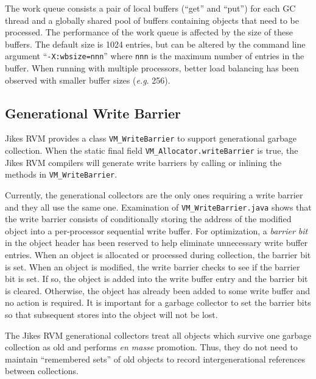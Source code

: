 The work queue consists a pair of local buffers (``get'' and ``put'') for each GC thread
and a globally shared pool of buffers containing objects that need to be processed.  
The performance of the work queue is affected by the size of these buffers.  
The default size is 1024 entries, but can be altered by the command line argument ``{\tt -X:wbsize=nnn}'' 
where {\tt nnn} is the maximum number of entries in the buffer.  When running with multiple
processors, better load balancing has been observed with smaller buffer sizes ({\it e.g}. 256).

\subsection{Generational Write Barrier} \label{sssec:writebarrier}
Jikes RVM provides a class {\tt VM\_WriteBarrier} to support generational garbage collection.
When the static final field {\tt VM\_Allocator.writeBarrier} is true,
the Jikes RVM compilers will generate write barriers by calling or inlining the methods in
{\tt VM\_WriteBarrier}.

Currently, the generational collectors are the only ones requiring a write barrier
and they all use the same one.  Examination of {\tt VM\_WriteBarrier.java} shows
that the write barrier consists of conditionally storing the address of the modified object
into a per-processor sequential write buffer.  For optimization, a {\it barrier bit} in the object header
has been reserved to help eliminate unnecessary write buffer entries.
When an object is allocated or processed during collection, the barrier bit is set.
When an object is modified, the write barrier checks to see if the barrier bit is set.
If so, the object is added into the write buffer entry and the barrier bit is cleared.
Otherwise, the object has already been added to some write buffer and no action is required.
It is important for a garbage collector to set the barrier bits so that
subsequent stores into the object will not be lost.

The Jikes RVM generational collectors treat all objects which survive one garbage collection as old
and performs {\it en masse} promotion.  Thus, they do not need to maintain ``remembered sets''
of old objects to record intergenerational references between collections.



